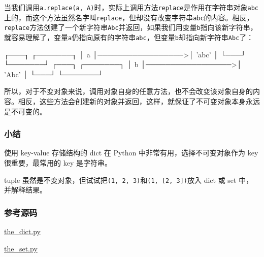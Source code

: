 当我们调用\texttt{a.replace(\textquotesingle{}a\textquotesingle{},\ \textquotesingle{}A\textquotesingle{})}时，实际上调用方法\texttt{replace}是作用在字符串对象\texttt{\textquotesingle{}abc\textquotesingle{}}上的，而这个方法虽然名字叫\texttt{replace}，但却没有改变字符串\texttt{\textquotesingle{}abc\textquotesingle{}}的内容。相反，\texttt{replace}方法创建了一个新字符串\texttt{\textquotesingle{}Abc\textquotesingle{}}并返回，如果我们用变量\texttt{b}指向该新字符串，就容易理解了，变量\texttt{a}仍指向原有的字符串\texttt{\textquotesingle{}abc\textquotesingle{}}，但变量\texttt{b}却指向新字符串\texttt{\textquotesingle{}Abc\textquotesingle{}}了：

\begin{pythoncode}
┌───┐                  ┌───────┐
│ a │─────────────────>│ 'abc' │
└───┘                  └───────┘
┌───┐                  ┌───────┐
│ b │─────────────────>│ 'Abc' │
└───┘                  └───────┘
\end{pythoncode}

所以，对于不变对象来说，调用对象自身的任意方法，也不会改变该对象自身的内容。相反，这些方法会创建新的对象并返回，这样，就保证了不可变对象本身永远是不可变的。

\hypertarget{ux5c0fux7ed3}{%
\subsubsection{小结}\label{ux5c0fux7ed3}}

使用 key-value 存储结构的 dict 在 Python 中非常有用，选择不可变对象作为
key 很重要，最常用的 key 是字符串。

tuple
虽然是不变对象，但试试把\texttt{(1,\ 2,\ 3)}和\texttt{(1,\ {[}2,\ 3{]})}放入
dict 或 set 中，并解释结果。

\hypertarget{ux53c2ux8003ux6e90ux7801}{%
\subsubsection{参考源码}\label{ux53c2ux8003ux6e90ux7801}}

\href{https://github.com/michaelliao/learn-python3/blob/master/samples/basic/the_dict.py}{the\_dict.py}

\href{https://github.com/michaelliao/learn-python3/blob/master/samples/basic/the_set.py}{the\_set.py}

